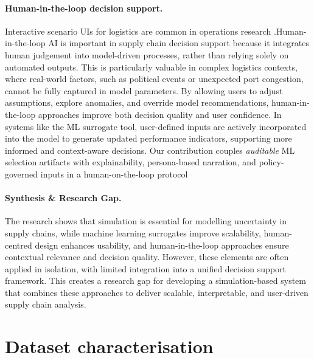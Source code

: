 \documentclass[12pt,twocolumn,a4paper]{article}
\theoremstyle{plain}
\theoremstyle{definition}
\theoremstyle{remark}
\begin{document}
\paragraph{Human-in-the-loop decision support.}
Interactive scenario UIs for logistics are common in operations research \cite{breiman2001random}.Human-in-the-loop AI is important in supply chain decision support because it integrates human judgement into model-driven processes, rather than relying solely on automated outputs. This is particularly valuable in complex logistics contexts, where real-world factors, such as political events or unexpected port congestion, cannot be fully captured in model parameters. By allowing users to adjust assumptions, explore anomalies, and override model recommendations, human-in-the-loop approaches improve both decision quality and user confidence. In systems like the ML surrogate tool, user-defined inputs are actively incorporated into the model to generate updated performance indicators, supporting more informed and context-aware decisions.
Our contribution couples \emph{auditable} ML selection artifacts with explainability, persona-based narration, and policy-governed inputs in a human-on-the-loop protocol 

\paragraph{Synthesis & Research Gap.}
The research shows that simulation is essential for modelling uncertainty in supply chains, while machine learning surrogates improve scalability, human-centred design enhances usability, and human-in-the-loop approaches ensure contextual relevance and decision quality. However, these elements are often applied in isolation, with limited integration into a unified decision support framework. This creates a research gap for developing a simulation-based system that combines these approaches to deliver scalable, interpretable, and user-driven supply chain analysis.

\section{Dataset characterisation}
\label{sec:Dataset characterisation}
\end{document}
